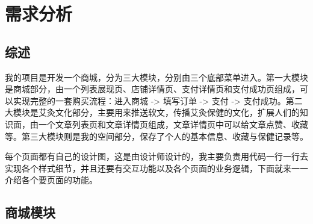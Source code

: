 
\chapter{需求分析}
  \label{chap:需求分析}

\section{综述}
  \label{sec:综述}
    我的项目是开发一个商城，分为三大模块，分别由三个底部菜单进入。第一大模块是商城部分，由一个列表展现页、店铺详情页、支付详情页和支付成功页组成，可以实现完整的一套购买流程：进入商城 -> 填写订单 -> 支付 -> 支付成功。第二大模块是艾灸文化部分，主要用来推送软文，传播艾灸保健的文化，扩展人们的知识面，由一个文章列表页和文章详情页组成，文章详情页中可以给文章点赞、收藏等。第三大模块则是我的空间部分，保存了个人的基本信息、收藏与保健记录等。
    \par
    每个页面都有自己的设计图，这是由设计师设计的，我主要负责用代码一行一行去实现各个样式细节，并且还要有交互功能以及各个页面的业务逻辑，下面就来一一介绍各个要页面的功能。

\clearpage
\section{商城模块}
  \label{sec:商城模块}
